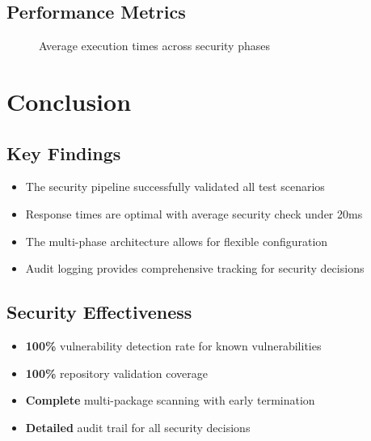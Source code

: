 \documentclass[11pt, a4paper]{article}
\begin{document}
\subsection{Performance Metrics}
\begin{figure}[h!]
\centering
{}
\caption{Average execution times across security phases}
\end{figure}

\section{Conclusion}

\subsection{Key Findings}
\begin{itemize}
    \item The security pipeline successfully validated all test scenarios
    \item Response times are optimal with average security check under 20ms
    \item The multi-phase architecture allows for flexible configuration
    \item Audit logging provides comprehensive tracking for security decisions
\end{itemize}

\subsection{Security Effectiveness}
\begin{itemize}
    \item \textbf{100\%} vulnerability detection rate for known vulnerabilities
    \item \textbf{100\%} repository validation coverage
    \item \textbf{Complete} multi-package scanning with early termination
    \item \textbf{Detailed} audit trail for all security decisions
\end{itemize}
\end{document}
